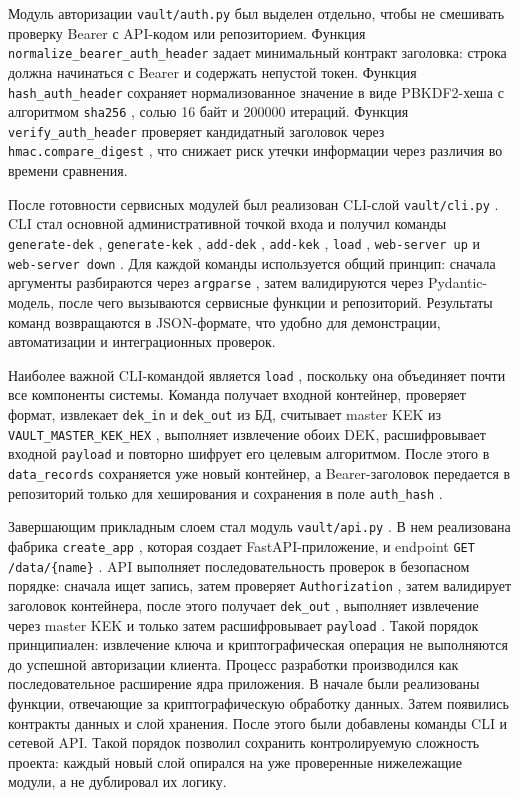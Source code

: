 \documentclass[14pt, a4paper]{extarticle}
\renewcommand{\texttt}[1]{%
  {\def\UrlFont{\ttfamily}\nolinkurl{#1}}%
}
\begin{document}
	Модуль авторизации \texttt{vault/auth.py} был выделен отдельно, чтобы не смешивать проверку Bearer с API-кодом или репозиторием. Функция \texttt{normalize\_bearer\_auth\_header} задает минимальный контракт заголовка: строка должна начинаться с Bearer и содержать непустой токен. Функция \texttt{hash\_auth\_header} сохраняет нормализованное значение в виде PBKDF2-хеша с алгоритмом \texttt{sha256}, солью 16 байт и 200000 итераций. Функция \texttt{verify\_auth\_header} проверяет кандидатный заголовок через \texttt{hmac.compare\_digest}, что снижает риск утечки информации через различия во времени сравнения.
	
	После готовности сервисных модулей был реализован CLI-слой \texttt{vault/cli.py}. CLI стал основной административной точкой входа и получил команды \texttt{generate-dek}, \texttt{generate-kek}, \texttt{add-dek}, \texttt{add-kek}, \texttt{load}, \texttt{web-server up} и \texttt{web-server down}. Для каждой команды используется общий принцип: сначала аргументы разбираются через \texttt{argparse}, затем валидируются через Pydantic-модель, после чего вызываются сервисные функции и репозиторий. Результаты команд возвращаются в JSON-формате, что удобно для демонстрации, автоматизации и интеграционных проверок.
	
	Наиболее важной CLI-командой является \texttt{load}, поскольку она объединяет почти все компоненты системы. Команда получает входной контейнер, проверяет формат, извлекает \texttt{dek\_in} и \texttt{dek\_out} из БД, считывает master KEK из \texttt{VAULT\_MASTER\_KEK\_HEX}, выполняет извлечение обоих DEK, расшифровывает входной \texttt{payload} и повторно шифрует его целевым алгоритмом. После этого в \texttt{data\_records} сохраняется уже новый контейнер, а Bearer-заголовок передается в репозиторий только для хеширования и сохранения в поле \texttt{auth\_hash}.
	
	Завершающим прикладным слоем стал модуль \texttt{vault/api.py}. В нем реализована фабрика \texttt{create\_app}, которая создает FastAPI-приложение, и endpoint \texttt{GET /data/{name}}. API выполняет последовательность проверок в безопасном порядке: сначала ищет запись, затем проверяет \texttt{Authorization}, затем валидирует заголовок контейнера, после этого получает \texttt{dek\_out}, выполняет извлечение через master KEK и только затем расшифровывает \texttt{payload}. Такой порядок принципиален: извлечение ключа и криптографическая операция не выполняются до успешной авторизации клиента. Процесс разработки производился как последовательное расширение ядра приложения. В начале были реализованы функции, отвечающие за криптографическую обработку данных. Затем появились контракты данных и слой хранения. После этого были добавлены команды CLI и сетевой API. Такой порядок позволил сохранить контролируемую сложность проекта: каждый новый слой опирался на уже проверенные нижележащие модули, а не дублировал их логику.	
	
\end{document}
